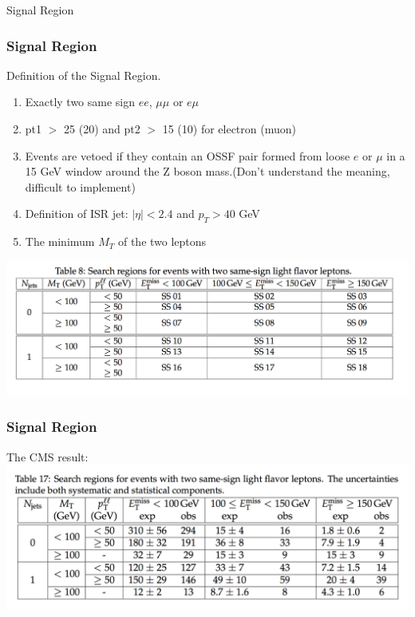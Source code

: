 \documentclass[mathserif,serif]{beamer}
\begin{document}
\begin{frame}
\begin{center}
\huge
Signal Region
\end{center}
\end{frame}

\begin{frame}
\frametitle{Signal Region}
Definition of the Signal Region.
\begin{enumerate}
\item Exactly two same sign $ee$, $\mu\mu$ or $e\mu$
\item pt1 $>$ 25 (20) and pt2 $>$ 15 (10) for electron (muon)
\item Events are vetoed if they contain an OSSF pair formed from loose $e$ or $\mu$ in a 15 GeV window around the Z boson mass.(Don't understand the meaning, difficult to implement)
\item Definition of ISR jet: $|\eta| < 2.4$ and $p_T > 40$ GeV
\item The minimum $M_T$ of the two leptons
\end{enumerate}
\includegraphics[width=1\textwidth]{data/photo/SR.png}
\end{frame}

\begin{frame}
\frametitle{Signal Region}
The CMS result:
\includegraphics[width=1\textwidth]{data/photo/result.png}
\end{frame}
\end{document}

